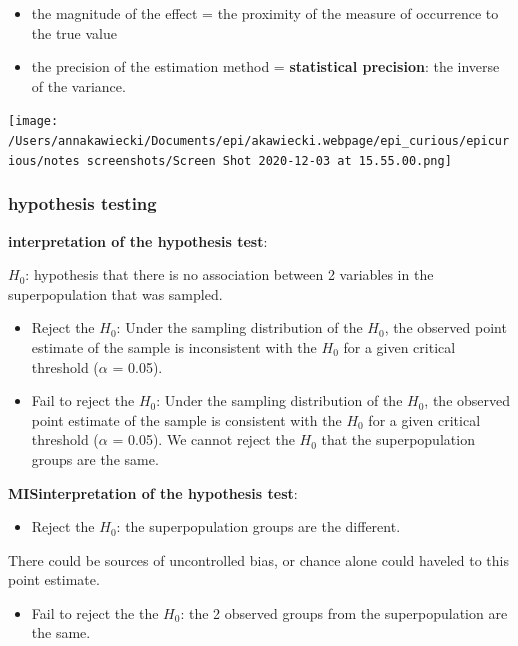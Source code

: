\documentclass[
]{article}
\providecommand{\tightlist}{%
  \setlength{\itemsep}{0pt}\setlength{\parskip}{0pt}}
\begin{document}
\begin{itemize}
\item
  the magnitude of the effect = the proximity of the measure of
  occurrence to the true value
\item
  the precision of the estimation method = \textbf{statistical
  precision}: the inverse of the variance.
\end{itemize}

\texttt{[image: /Users/annakawiecki/Documents/epi/akawiecki.webpage/epi\_curious/epicurious/notes screenshots/Screen Shot 2020-12-03 at 15.55.00.png]}

\hypertarget{hypothesis-testing}{%
\subsubsection{hypothesis testing}\label{hypothesis-testing}}

\textbf{interpretation of the hypothesis test}:

\(H_0\): hypothesis that there is no association between 2 variables in
the superpopulation that was sampled.

\begin{itemize}
\item
  Reject the \(H_0\): Under the sampling distribution of the \(H_0\),
  the observed point estimate of the sample is inconsistent with the
  \(H_0\) for a given critical threshold (\(\alpha\) = 0.05).
\item
  Fail to reject the \(H_0\): Under the sampling distribution of the
  \(H_0\), the observed point estimate of the sample is consistent with
  the \(H_0\) for a given critical threshold (\(\alpha\) = 0.05). We
  cannot reject the \(H_0\) that the superpopulation groups are the
  same.
\end{itemize}

\textbf{MISinterpretation of the hypothesis test}:

\begin{itemize}
\tightlist
\item
  Reject the \(H_0\): the superpopulation groups are the different.
\end{itemize}

There could be sources of uncontrolled bias, or chance alone could
haveled to this point estimate.

\begin{itemize}
\tightlist
\item
  Fail to reject the the \(H_0\): the 2 observed groups from the
  superpopulation are the same.
\end{itemize}
\end{document}
